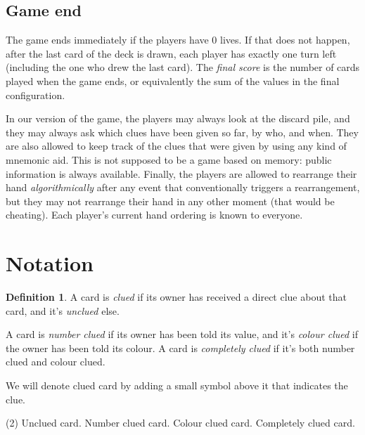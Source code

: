 \documentclass[a4paper]{article}
\theoremstyle{plain}
\theoremstyle{definition}
\newtheorem{definition}[theorem]{Definition}
\newtheorem{note}[theorem]{Note}
\begin{document}
\subsection{Game end}

The game ends immediately if the players have 0 lives. If that does not happen, after the last card of the deck is drawn, each player has exactly one turn left (including the one who drew the last card). The \textit{final score} is the number of cards played when the game ends, or equivalently the sum of the values in the final configuration.


In our version of the game, the players may always look at the discard pile, and they may always ask which clues have been given so far, by who, and when. They are also allowed to keep track of the clues that were given by using any kind of mnemonic aid. This is not supposed to be a game based on memory: public information is always available. Finally, the players are allowed to rearrange their hand \textit{algorithmically} after any event that conventionally triggers a rearrangement, but they may not rearrange their hand in any other moment (that would be cheating). Each player's current hand ordering is known to everyone.

\section{Notation}

\begin{definition}
	A card is \textit{clued} if its owner has received a direct clue about that card, and it's \textit{unclued} else.
	
	A card is \textit{number clued} if its owner has been told its value, and it's \textit{colour clued} if the owner has been told its colour. A card is \textit{completely clued} if it's both number clued and colour clued.
\end{definition}

We will denote clued card by adding a small symbol above it that indicates the clue.

\begin{tasks}(2)
	\task[$\bullet$] Unclued card. 
	\task[$\bullet$] Number clued card. 
	\task[$\bullet$] Colour clued card. 
	\task[$\bullet$] Completely clued card. 
\end{tasks}
\end{document}
